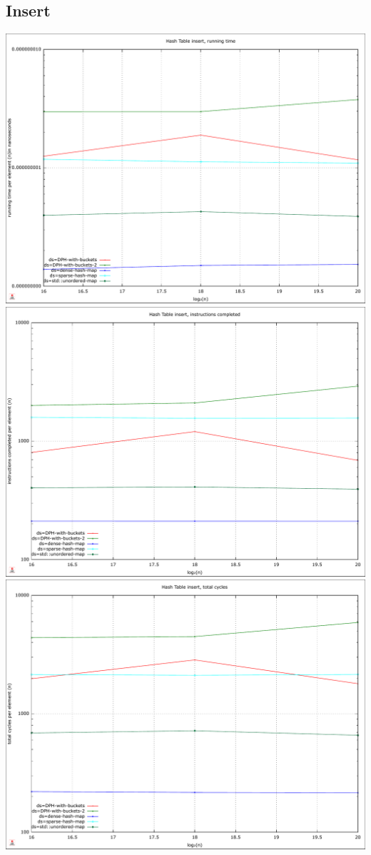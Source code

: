 \documentclass{article}
\begin{document}
\subsection*{Insert}
\centering
\includegraphics[width=\linewidth]{img/hash_insert_time}
\includegraphics[width=\linewidth]{img/hash_insert_instructions}
\includegraphics[width=\linewidth]{img/hash_insert_cycles}
\end{document}
